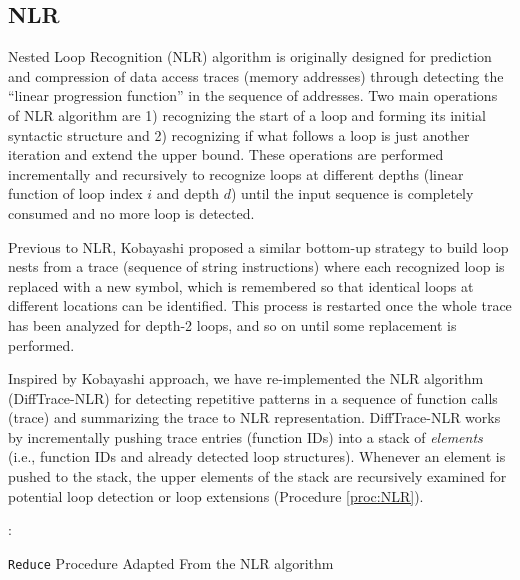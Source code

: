 
\subsection{NLR}
\label{subsec:algo-nlr}
Nested Loop Recognition (NLR) algorithm \cite{Ketterlin-nlr} is originally designed for prediction and compression of data access traces (memory addresses) through detecting the ``linear progression function'' in the sequence of addresses. Two main operations of NLR algorithm are 1) recognizing the start of a loop and forming its initial syntactic structure and 2) recognizing if what follows a loop is just another iteration and extend the upper bound. These operations are performed incrementally and recursively to recognize loops at different depths (linear function of loop index $i$ and depth $d$) until the input sequence is completely consumed and no more loop is detected.

Previous to NLR, Kobayashi \cite{kobayashi-84} proposed a similar bottom-up strategy to build loop nests from a trace (sequence of string instructions) where each recognized loop is replaced with a new symbol, which is remembered so that identical loops at different locations can be identified. This process is restarted once the whole trace has been analyzed for depth-2 loops, and so on until some replacement is performed.

Inspired by Kobayashi approach, we have re-implemented the NLR algorithm (DiffTrace-NLR) for detecting repetitive patterns in a sequence of function calls (trace) and summarizing the trace to NLR representation. DiffTrace-NLR works by incrementally pushing trace entries (function IDs) into a stack of \textit{elements} (i.e., function IDs and already detected loop structures). Whenever an element is pushed to the stack, the upper elements of the stack are recursively examined for potential loop detection or loop extensions (Procedure \ref{proc:NLR}). 



\begin{algorithm}[]
 \DontPrintSemicolon
 :{\\
 \Indp
 }

 \caption{\texttt{Reduce} Procedure Adapted From the NLR algorithm }
 \label{proc:NLR}
\end{algorithm}

